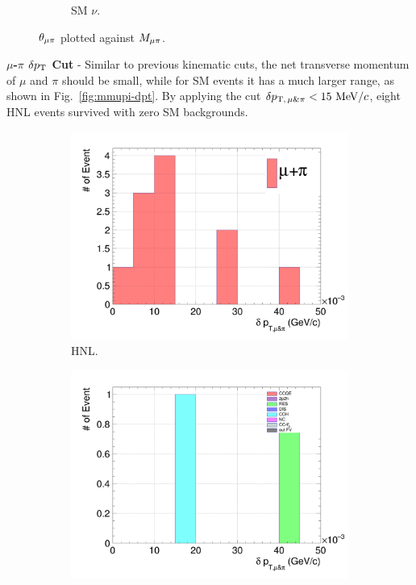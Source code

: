 \begin{figure}[!htb]
\begin{subfigure}{\dbfigwid\textwidth}
                \caption{SM $\nu$.}
                \label{fig:sm-mmupi}
           \end{subfigure}
           \caption{$\theta_{\mu\pi}$ plotted against $M_{\mu\pi}$.}
           \label{fig:mmupi-mupiang}
        \end{figure}

        \textbf{$\mu$-$\pi$ $\delta p_\textrm{T}$ Cut} - Similar to previous kinematic cuts, the net transverse momentum of $\mu$ and $\pi$ should be small, while for SM events it has a much larger range, as shown in Fig.~\ref{fig:mmupi-dpt}. By applying the cut $\delta p_{\textrm{T},\,\mu\&\pi}<15~\textrm{MeV}/c$, eight HNL events survived with zero SM backgrounds.

        \begin{figure}[!htb]
           \centering
           \begin{subfigure}{0.45\textwidth}
                \includegraphics[width=\textwidth]{figures/hnl_sfgmu_mpdpt_stack_al9_300_aftmupikin.png}
                \caption{HNL.}
                \label{fig:hnl-mupidpt}
           \end{subfigure}
           \begin{subfigure}{0.45\textwidth}
                \includegraphics[width=\textwidth]{figures/hnl_sfgmu_mpdpt_stack_al9_SM_aftmupikin.png}

\end{subfigure}
\end{figure}
